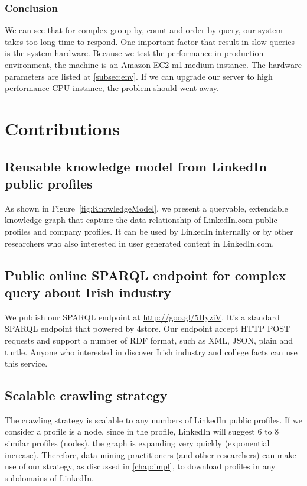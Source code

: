 \subsubsection{Conclusion}
We can see that for complex group by, count and order by query, our system takes too long time to respond. One important factor that result in slow queries is the system hardware. Because we test the performance in production environment, the machine is an Amazon EC2 m1.medium instance. The hardware parameters are listed at \autoref{subsec:env}. If we can upgrade our server to high performance CPU instance, the problem should went away.

\section{Contributions}
\subsection{Reusable knowledge model from LinkedIn public profiles}
As shown in Figure~\ref{fig:KnowledgeModel}, we present a queryable, extendable knowledge graph that capture the data relationship of LinkedIn.com public profiles and company profiles. It can be used by LinkedIn internally or by other researchers who also interested in user generated content in LinkedIn.com.

\subsection{Public online SPARQL endpoint for complex query about Irish industry}
We publish our SPARQL endpoint at \url{http://goo.gl/5HyziV}. It's a standard SPARQL endpoint that powered by 4store\cite{harris20094store}. Our endpoint accept HTTP POST requests and support a number of RDF format, such as XML, JSON, plain and turtle. Anyone who interested in discover Irish industry and college facts can use this service.

\subsection{Scalable crawling strategy}
The crawling strategy is scalable to any numbers of LinkedIn public profiles. If we consider a profile is a node, since in the profile, LinkedIn will suggest 6 to 8 similar profiles (nodes), the graph is expanding very quickly (exponential increase). Therefore, data mining practitioners (and other researchers) can make use of our strategy, as discussed in \autoref{chap:impl}, to download profiles in any subdomains of LinkedIn.

